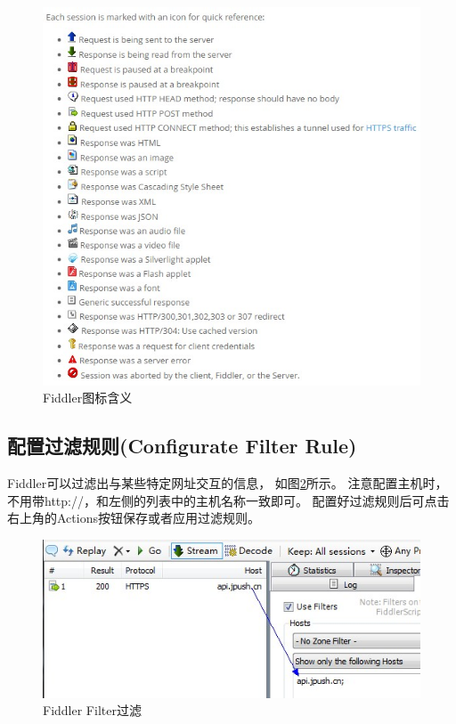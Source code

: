 \documentclass{book}
\begin{document}
\begin{figure}[htbp]
	\centering
	\includegraphics[scale=0.6]{MeaningOfFiddlerIcon.jpg}
	\caption{Fiddler图标含义}
	\label{fig:MeaningOfFiddlerIcon}
\end{figure}

\subsection{配置过滤规则(Configurate Filter Rule)}

Fiddler可以过滤出与某些特定网址交互的信息，
如图\ref{fig:FiddlerFilter}所示。
注意配置主机时，不用带http://，和左侧的列表中的主机名称一致即可。
配置好过滤规则后可点击右上角的Actions按钮保存或者应用过滤规则。

\begin{figure}[htbp]
	\centering
	\includegraphics[scale=0.8]{FiddlerFilter.jpg}
	\caption{Fiddler Filter过滤}
	\label{fig:FiddlerFilter}
\end{figure}
\end{document}
